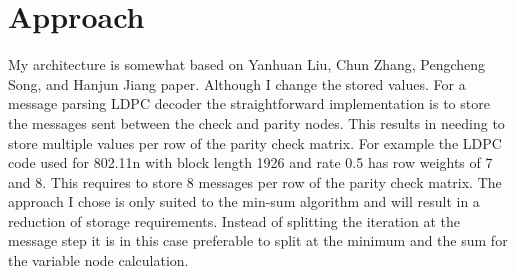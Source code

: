 
\chapter{Approach}
My architecture is somewhat based on  Yanhuan Liu, Chun Zhang, Pengcheng Song, and Hanjun Jiang\cite{LiZh17} paper. Although I change the stored values. For a message parsing LDPC decoder the straightforward implementation is to store the messages sent between the check and parity nodes. This results in needing to store multiple values per row of the parity check matrix. For example the LDPC code used for 802.11n with block length 1926 and rate 0.5 has row weights of 7 and 8. This requires to store 8 messages per row of the parity check matrix. The approach I chose is only suited to the min-sum algorithm and will result in a reduction of storage requirements. Instead of splitting the iteration at the message step it is in this case preferable to split at the minimum and the sum for the variable node calculation.